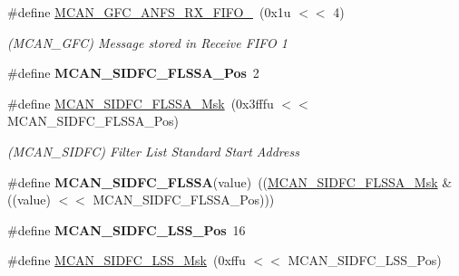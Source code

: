 \begin{DoxyCompactItemize}
\mbox{\label{group__SAME70__MCAN_gaa8cbd93941516a7c1da33e5f5063f312}} 
\#define \mbox{\hyperlink{group__SAME70__MCAN_gaa8cbd93941516a7c1da33e5f5063f312}{M\+C\+A\+N\+\_\+\+G\+F\+C\+\_\+\+A\+N\+F\+S\+\_\+\+R\+X\+\_\+\+F\+I\+F\+O\+\_}}~(0x1u $<$$<$ 4)
\begin{DoxyCompactList}\small\item\em (M\+C\+A\+N\+\_\+\+G\+FC) Message stored in Receive F\+I\+FO 1 \end{DoxyCompactList}\item 
\mbox{\label{group__SAME70__MCAN_ga06e7f367dc9ff3ed128b790b6f8b5af0}} 
\#define {\bfseries M\+C\+A\+N\+\_\+\+S\+I\+D\+F\+C\+\_\+\+F\+L\+S\+S\+A\+\_\+\+Pos}~2
\item 
\mbox{\label{group__SAME70__MCAN_ga32274be4ecd43f1fc702770906fb00cb}} 
\#define \mbox{\hyperlink{group__SAME70__MCAN_ga32274be4ecd43f1fc702770906fb00cb}{M\+C\+A\+N\+\_\+\+S\+I\+D\+F\+C\+\_\+\+F\+L\+S\+S\+A\+\_\+\+Msk}}~(0x3fffu $<$$<$ M\+C\+A\+N\+\_\+\+S\+I\+D\+F\+C\+\_\+\+F\+L\+S\+S\+A\+\_\+\+Pos)
\begin{DoxyCompactList}\small\item\em (M\+C\+A\+N\+\_\+\+S\+I\+D\+FC) Filter List Standard Start Address \end{DoxyCompactList}\item 
\mbox{\label{group__SAME70__MCAN_ga21486405b3a818f664a47f7a94057ec0}} 
\#define {\bfseries M\+C\+A\+N\+\_\+\+S\+I\+D\+F\+C\+\_\+\+F\+L\+S\+SA}(value)~((\mbox{\hyperlink{group__SAMV71__MCAN_ga32274be4ecd43f1fc702770906fb00cb}{M\+C\+A\+N\+\_\+\+S\+I\+D\+F\+C\+\_\+\+F\+L\+S\+S\+A\+\_\+\+Msk}} \& ((value) $<$$<$ M\+C\+A\+N\+\_\+\+S\+I\+D\+F\+C\+\_\+\+F\+L\+S\+S\+A\+\_\+\+Pos)))
\item 
\mbox{\label{group__SAME70__MCAN_ga3eee89e9d10db90dad7a58515e8ea7e0}} 
\#define {\bfseries M\+C\+A\+N\+\_\+\+S\+I\+D\+F\+C\+\_\+\+L\+S\+S\+\_\+\+Pos}~16
\item 
\mbox{\label{group__SAME70__MCAN_ga1e2bedadca91b09be2fcdbe51235b2d3}} 
\#define \mbox{\hyperlink{group__SAME70__MCAN_ga1e2bedadca91b09be2fcdbe51235b2d3}{M\+C\+A\+N\+\_\+\+S\+I\+D\+F\+C\+\_\+\+L\+S\+S\+\_\+\+Msk}}~(0xffu $<$$<$ M\+C\+A\+N\+\_\+\+S\+I\+D\+F\+C\+\_\+\+L\+S\+S\+\_\+\+Pos)

\end{DoxyCompactItemize}
